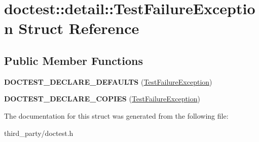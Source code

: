 \hypertarget{structdoctest_1_1detail_1_1_test_failure_exception}{}\section{doctest\+::detail\+::Test\+Failure\+Exception Struct Reference}
\label{structdoctest_1_1detail_1_1_test_failure_exception}
\subsection*{Public Member Functions}
\begin{DoxyCompactItemize}
\item 
\mbox{\label{structdoctest_1_1detail_1_1_test_failure_exception_a041d6c44a6fad29f89f59da38017bbc4}} 
{\bfseries D\+O\+C\+T\+E\+S\+T\+\_\+\+D\+E\+C\+L\+A\+R\+E\+\_\+\+D\+E\+F\+A\+U\+L\+TS} (\mbox{\hyperlink{structdoctest_1_1detail_1_1_test_failure_exception}{Test\+Failure\+Exception}})
\item 
\mbox{\label{structdoctest_1_1detail_1_1_test_failure_exception_a74d7c7d5cfe02525148c5f7d100fd9ac}} 
{\bfseries D\+O\+C\+T\+E\+S\+T\+\_\+\+D\+E\+C\+L\+A\+R\+E\+\_\+\+C\+O\+P\+I\+ES} (\mbox{\hyperlink{structdoctest_1_1detail_1_1_test_failure_exception}{Test\+Failure\+Exception}})
\end{DoxyCompactItemize}


The documentation for this struct was generated from the following file\+:\begin{DoxyCompactItemize}
\item 
third\+\_\+party/doctest.\+h\end{DoxyCompactItemize}
